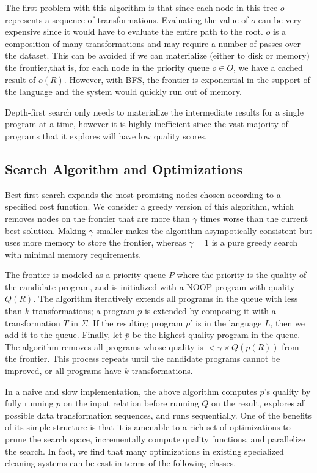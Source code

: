  The first problem with this algorithm is that since each node in this tree $o$ represents a sequence of transformations.
 Evaluating the value of $o$ can be very expensive since it would have to evaluate the entire path to the root.
 $o$ is a composition of many transformations and may require a number of passes over the dataset.
 This can be avoided if we can materialize (either to disk or memory) the frontier,that is, for each node in the priority queue $o \in O$, we have a cached result of $o(R)$. 
 However, with BFS, the frontier is exponential in the support of the language and the system would quickly run out of memory.

 Depth-first search only needs to materialize the intermediate results for a single program at a time, however it is highly inefficient since the vast majority of programs that it explores will have low quality scores.  


\subsection*{Search Algorithm and Optimizations}
Best-first search expands the most promising nodes chosen according to a specified cost function.
We consider a greedy version of this algorithm, which removes nodes on the frontier that are more than $\gamma$ times worse than the current best solution.
Making $\gamma$ smaller makes the algorithm asympotically consistent but uses more memory to store the frontier, whereas $\gamma=1$ is a pure greedy search with minimal memory requirements.  

The frontier is modeled as a priority queue $P$ where the priority is the quality of the candidate program, and is initialized with a NOOP program with quality $Q(R)$.  
The algorithm iteratively extends all programs in the queue with less than $k$ transformations; a program $p$ is extended by composing it with a transformation $T$ in $\Sigma$.  If the resulting program $p'$ is in the language $L$, then we add it to the queue.
Finally, let $\bar{p}$ be the highest quality program in the queue.  The algorithm removes all programs whose quality is $<\gamma\times Q(\bar{p}(R))$ from the frontier.  
This process repeats until the candidate programs cannot be improved, or all programs have $k$ transformations.

In a naive and slow implementation, the above algorithm computes $p$'s quality by fully running $p$ on the input relation before running $Q$ on the result, explores all possible data transformation sequences, and runs sequentially.  One of the benefits of its simple structure is that it is amenable to a rich set of optimizations to prune the search space, incrementally compute quality functions, and parallelize the search.  In fact, we find that many optimizations in existing specialized cleaning systems can be cast in terms of the following classes.

